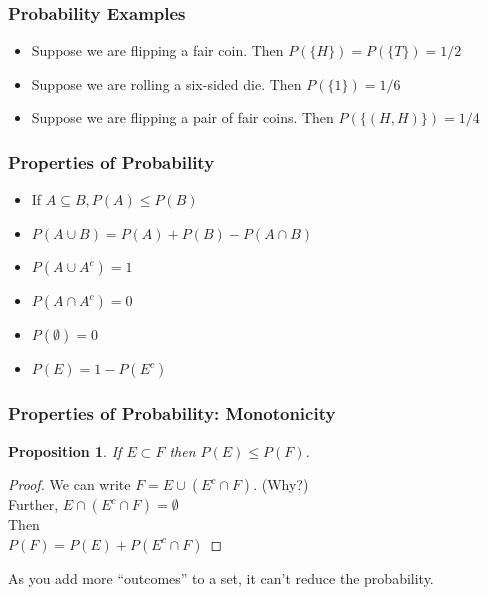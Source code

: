 \documentclass{beamer}
\newtheorem{prop}{Proposition}
\numberwithin{equation}{section}
\begin{document}
\begin{frame}
\frametitle{Probability Examples}

\pause 

\begin{itemize}
\item[-] Suppose we are flipping a \alert{fair} coin.  Then $P(\{H\}) = P(\{T\}) = 1/2 $\pause 
\item[-] Suppose we are rolling a six-sided die.  Then $P(\{1\}) = 1/6$ \pause 
\item[-] Suppose we are flipping a pair of fair coins.  Then $P(\{(H, H)\}) = 1/4$
\end{itemize}

\end{frame}

\begin{frame}
\frametitle{Properties of Probability}

\pause 

\begin{itemize}
\item[-] If $A\subseteq B, P(A)\leq P(B) $\pause 
\item[-] $P(A\cup B)= P(A)+P(B)-P(A\cap B)$  \pause 
\item[-] $P(A\cup A^{c}) = 1$
\item[-] $P(A\cap A^{c}) = 0$ 
\item[-] $P(\emptyset) = 0 $  
\item[-] $P(E) = 1 - P(E^{c})  $ 
\end{itemize}

\end{frame}

\begin{frame}
\frametitle{Properties of Probability: Monotonicity} 
\pause 
\begin{prop} 
If $E \subset F$ then $P(E) \leq P(F)$.  
\end{prop}  \pause 
\begin{proof}  \pause 
We can write $F = E \cup ( E^{c} \cap F)$. (Why?) \\ \pause 
Further, $E\cap(E^{c} \cap F )= \emptyset$ \\
\pause 
Then \\ \pause 
$P(F) = P(E) + P(E^{c} \cap F) $  \pause 
\end{proof}
As you add more ``outcomes''  to a set, it can't reduce the
probability.  
\end{frame}
\end{document}
